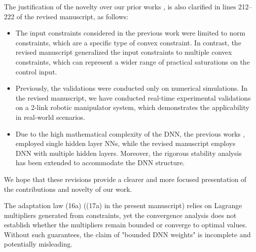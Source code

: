 \documentclass[12pt,english]{reviewresponse}
\begin{document}
\begin{revresponse}
  \bigskip

  The justification of the novelty over our prior works \cite{Ryu:2025aa}, \cite{Ryu:2025ab} is also clarified in lines 212--222 of the revised manuscript, as follows:
  \begin{itemize}
    \item 
      The input constraints considered in the previous work \cite{Ryu:2025aa} were limited to norm constraints, which are a specific type of convex constraint.
      In contrast, the revised manuscript generalized the input constraints to multiple convex constraints, which can represent a wider range of practical saturations on the control input.

    \item 
      Previously, the validations were conducted only on numerical simulations.
      In the revised manuscript, we have conducted real-time experimental validations on a 2-link robotic manipulator system, which demonstrates the applicability in real-world scenarios.

    \item 
      Due to the high mathematical complexity of the DNN, the previous works \cite{Ryu:2025aa}, \cite{Ryu:2025ab} employed single hidden layer NNs, while the revised manuscript employs DNN with multiple hidden layers.
      Moreover, the rigorous stability analysis has been extended to accommodate the DNN structure.
      
  \end{itemize}

  \vspace{1.2em}

  We hope that these revisions provide a clearer and more focused presentation of the contributions and novelty of our work.

\end{revresponse}

%
\begin{revcomment}[1][1]{}
	The adaptation law (16a) ((17a) in the present manuscript) relies on Lagrange multipliers generated from constraints, yet the convergence analysis does not establish whether the multipliers remain bounded or converge to optimal values. Without such guarantees, the claim of "bounded DNN weights" is incomplete and potentially misleading.
\end{revcomment}
\end{document}
